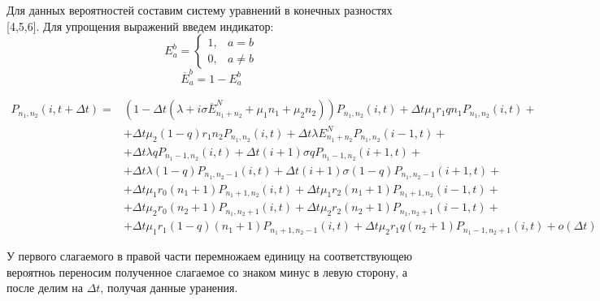 Для данных вероятностей составим систему уравнений в конечных разностях [4,5,6]. 
Для упрощения выражений введем индикатор:
\begin{equation*}
	E_a^b = 
	\begin{cases}
		1, &{a=b}\\
		0, &{a \neq b}
	\end{cases}
\end{equation*}
\begin{equation*}
	\overline{E}_{a}^b = 1 - E_a^b
\end{equation*}
\begin{adjustwidth}{-40pt}{100pt}
\begin{align*} 
P_{n_{1}, n_{2}}(i,t+\Delta t)=&(1-\Delta t(\lambda+i\sigma \overline{E}_{n_{1}+n_{2}}^N+\mu_{1}n_{1}+\mu_{2}n_{2}))P_{n_{1}, n_{2}}(i,t)+\Delta t\mu_{1}r_{1}qn_{1}P_{n_{1}, n_{2}}(i,t)+\\
&+\Delta t \mu_{2}(1-q)r_{1}n_{2}P_{n_{1}, n_{2}}(i,t)+\Delta t \lambda E_{n_{1}+n_{2}}^N P_{n_{1}, n_{2}}(i-1,t)+\\
&+\Delta t\lambda qP_{n_{1}-1, n_{2}}(i,t) + \Delta t(i+1) \sigma q P_{n_{1}-1, n_{2}}(i+1,t)+\\
&+\Delta t\lambda (1-q)P_{n_{1}, n_{2}-1}(i,t) + \Delta t(i+1) \sigma (1-q) P_{n_{1}, n_{2}-1}(i+1,t)+\\
&+\Delta t \mu_{1} r_{0}(n_{1}+1) P_{n_{1} +1 , n_{2}}(i,t) + \Delta t \mu_{1} r_{2} (n_{1}+1) P_{n_{1} + 1, n_{2}}(i-1,t)+\\
&+\Delta t \mu_{2} r_{0}(n_{2}+1) P_{n_{1}, n_{2} + 1 }(i,t) + \Delta t\mu_{2} r_{2} (n_{2}+1) P_{n_{1}, n_{2} + 1}(i-1,t)+\\
&+\Delta t\mu_{1} r_{1}(1-q)(n_{1}+1) P_{n_{1} +1 , n_{2}-1}(i,t)+\Delta t\mu_{2} r_{1}q (n_{2}+1)P_{n_{1} -1 , n_{2}+1}(i,t)+o(\Delta t)
\end{align*}
\end{adjustwidth}
У первого слагаемого в правой части перемножаем единицу на соответствующею вероятноь переносим полученное слагаемое со знаком минус в левую сторону, а после делим на $\Delta t$, получая данные уранения.
